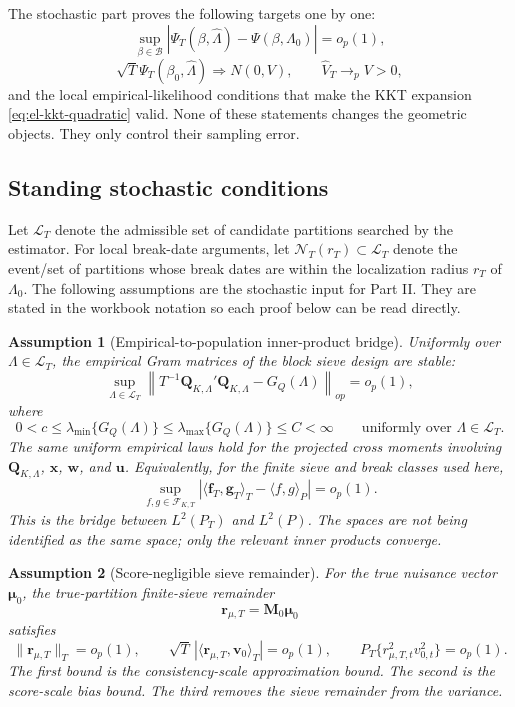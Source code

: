 \documentclass[12pt]{article}
\numberwithin{equation}{section}
\newtheorem{assumption}{Assumption}
\theoremstyle{definition}
\newcommand{\op}{o_p}
\newcommand{\innerT}[2]{\langle #1,#2\rangle_T}
\newcommand{\innerP}[2]{\langle #1,#2\rangle_P}
\begin{document}
The stochastic part proves the following targets one by one:
\begin{equation}
    \sup_{\beta\in\mathcal B}
    |\Psi_T(\beta,\widehat\Lambda)-\Psi(\beta,\Lambda_0)|=\op(1),
    \label{eq:uniform-bridge}
\end{equation}
\[
    \sqrt T\Psi_T(\beta_0,\widehat\Lambda)\Rightarrow N(0,V),
    \qquad
    \widehat V_T\to_p V>0,
\]
and the local empirical-likelihood conditions that make the KKT expansion
\eqref{eq:el-kkt-quadratic} valid. None of these statements changes the
geometric objects. They only control their sampling error.

\subsection{Standing stochastic conditions}

Let \(\mathcal L_T\) denote the admissible set of candidate partitions searched
by the estimator. For local break-date arguments, let
\(\mathcal N_T(r_T)\subset\mathcal L_T\) denote the event/set of partitions whose
break dates are within the localization radius \(r_T\) of \(\Lambda_0\). The
following assumptions are the stochastic input for Part II. They are stated in
the workbook notation so each proof below can be read directly.

\begin{assumption}[Empirical-to-population inner-product bridge]
\label{ass:gram-stability}
Uniformly over \(\Lambda\in\mathcal L_T\), the empirical Gram matrices of the
block sieve design are stable:
\[
    \sup_{\Lambda\in\mathcal L_T}
    \left\|T^{-1}\bm Q_{K,\Lambda}'\bm Q_{K,\Lambda}-G_Q(\Lambda)\right\|_{op}
    =\op(1),
\]
where
\[
    0<c\le \lambda_{\min}\{G_Q(\Lambda)\}
    \le \lambda_{\max}\{G_Q(\Lambda)\}\le C<\infty
    \qquad \text{uniformly over }\Lambda\in\mathcal L_T.
\]
The same uniform empirical laws hold for the projected cross moments involving
\(\bm Q_{K,\Lambda}\), \(\bm x\), \(\bm w\), and \(\bm u\). Equivalently, for
the finite sieve and break classes used here,
\[
    \sup_{f,g\in\mathcal F_{K,T}}
    |\innerT{\bm f_T}{\bm g_T}-\innerP{f}{g}|=\op(1).
\]
This is the bridge between \(L^2(P_T)\) and \(L^2(P)\). The spaces are not being
identified as the same space; only the relevant inner products converge.
\end{assumption}

\begin{assumption}[Score-negligible sieve remainder]
\label{ass:score-negligible-sieve-remainder}
For the true nuisance vector \(\bm\mu_0\), the true-partition finite-sieve
remainder
\[
    \bm r_{\mu,T}=\bm M_0\bm\mu_0
\]
satisfies
\[
    \|\bm r_{\mu,T}\|_T=\op(1),
    \qquad
    \sqrt T\,|\innerT{\bm r_{\mu,T}}{\bm v_0}|=\op(1),
    \qquad
    P_T\{r_{\mu,T,t}^2v_{0,t}^2\}=\op(1).
\]
The first bound is the consistency-scale approximation bound. The second is the
score-scale bias bound. The third removes the sieve remainder from the variance.
\end{assumption}
\end{document}
